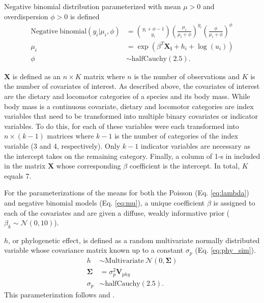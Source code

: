 \documentclass[12pt,letterpaper]{article}
\begin{document}
Negative binomial distribution parameterized with mean \(\mu > 0\) and overdispersion \(\phi > 0\) is defined
\begin{align}
  \mathrm{Negative\ binomial}(y_{i} | \mu_{i}, \phi) &= {y_{i} + \phi -1 \choose y_{i}} \left(\frac{\mu_{i}}{\mu_{i} + \phi}\right)^{y_{i}} \left(\frac{\phi}{\mu_{i} + \phi}\right)^{\phi}
  \label{eq:neg_bin} \\
  \mu_{i} &= \exp(\beta^{T}\mathbf{X_{i}} + h_{i} + \log(u_{i})) 
  \label{eq:mu} \\
  \phi &\sim \mathrm{halfCauchy}(2.5).
  \label{eq:phi} 
\end{align}


\(\mathbf{X}\) is defined as an \(n \times K\) matrix where \(n\) is the number of observations and \(K\) is the number of covariates of interest. As described above, the covariates of interest are the dietary and locomotor categories of a species and its body mass. While body mass is a continuous covariate, dietary and locomotor categories are index variables that need to be transformed into multiple binary covariates or indicator variables. To do this, for each of these variables were each transformed into \(n \times (k - 1)\) matrices where \(k - 1\) is the number of categories of the index variable (3 and 4, respectively). Only \(k - 1\) indicator variables are necessary as the intercept takes on the remaining category. Finally, a column of 1-s in included in the matrix \(\mathbf{X}\) whose corresponding \(\beta\) coefficient is the intercept. In total, \(K\) equals 7.

For the parameterizations of the means for both the Poisson (Eq. \ref{eq:lambda}) and negative binomial models (Eq. \ref{eq:mu}), a unique coefficient \(\beta\) is assigned to each of the covariates and are given a diffuse, weakly informative prior (\(\beta_{k} \sim \mathcal{N}(0, 10)\)).

\(h\), or phylogenetic effect, is defined as a random multivariate normally distributed variable whose covariance matrix known up to a constant \(\sigma_{p}\) (Eq. \ref{eq:phy_sim}).
\begin{align}
  h &\sim \mathrm{Multivariate\ }\mathcal{N}(0, \mathbf{\Sigma}) \label{eq:phy_sim} \\
  \mathbf{\Sigma} &= \sigma_{p}^{2} \mathbf{V}_{phy} \nonumber \\
  \sigma_{p} &\sim \mathrm{halfCauchy}(2.5). \nonumber
\end{align}
This parameterization follows \citet{Lynch1991} and \citet{Housworth2004}.
\end{document}
